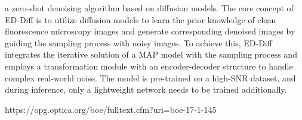 a zero-shot denoising algorithm based on diffusion models. The core concept of ED-Diff is to utilize diffusion models to learn the prior knowledge of clean fluorescence microscopy images and generate corresponding denoised images by guiding the sampling process with noisy images. To achieve this, ED-Diff integrates the iterative solution of a MAP model with the sampling process and employs a transformation module with an encoder-decoder structure to handle complex real-world noise. The model is pre-trained on a high-SNR dataset, and during inference, only a lightweight network needs to be trained additionally.

https://opg.optica.org/boe/fulltext.cfm?uri=boe-17-1-145

